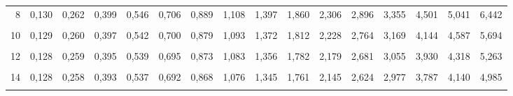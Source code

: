 \documentclass[
  ngerman,
]{article}
\begin{document}
\begin{table}[!h]
{\begin{tabular}{>{}r|rrrrrrrrrrrrrrr}
8 & 0,130 & 0,262 & 0,399 & 0,546 & 0,706 & 0,889 & 1,108 & 1,397 & 1,860 & 2,306 & 2,896 & 3,355 & 4,501 & 5,041 & 6,442\\
\cellcolor{gray!6}{9} & \cellcolor{gray!6}{0,129} & \cellcolor{gray!6}{0,261} & \cellcolor{gray!6}{0,398} & \cellcolor{gray!6}{0,543} & \cellcolor{gray!6}{0,703} & \cellcolor{gray!6}{0,883} & \cellcolor{gray!6}{1,100} & \cellcolor{gray!6}{1,383} & \cellcolor{gray!6}{1,833} & \cellcolor{gray!6}{2,262} & \cellcolor{gray!6}{2,821} & \cellcolor{gray!6}{3,250} & \cellcolor{gray!6}{4,297} & \cellcolor{gray!6}{4,781} & \cellcolor{gray!6}{6,010}\\
10 & 0,129 & 0,260 & 0,397 & 0,542 & 0,700 & 0,879 & 1,093 & 1,372 & 1,812 & 2,228 & 2,764 & 3,169 & 4,144 & 4,587 & 5,694\\
\addlinespace
\cellcolor{gray!6}{11} & \cellcolor{gray!6}{0,129} & \cellcolor{gray!6}{0,260} & \cellcolor{gray!6}{0,396} & \cellcolor{gray!6}{0,540} & \cellcolor{gray!6}{0,697} & \cellcolor{gray!6}{0,876} & \cellcolor{gray!6}{1,088} & \cellcolor{gray!6}{1,363} & \cellcolor{gray!6}{1,796} & \cellcolor{gray!6}{2,201} & \cellcolor{gray!6}{2,718} & \cellcolor{gray!6}{3,106} & \cellcolor{gray!6}{4,025} & \cellcolor{gray!6}{4,437} & \cellcolor{gray!6}{5,453}\\
12 & 0,128 & 0,259 & 0,395 & 0,539 & 0,695 & 0,873 & 1,083 & 1,356 & 1,782 & 2,179 & 2,681 & 3,055 & 3,930 & 4,318 & 5,263\\
\cellcolor{gray!6}{13} & \cellcolor{gray!6}{0,128} & \cellcolor{gray!6}{0,259} & \cellcolor{gray!6}{0,394} & \cellcolor{gray!6}{0,538} & \cellcolor{gray!6}{0,694} & \cellcolor{gray!6}{0,870} & \cellcolor{gray!6}{1,079} & \cellcolor{gray!6}{1,350} & \cellcolor{gray!6}{1,771} & \cellcolor{gray!6}{2,160} & \cellcolor{gray!6}{2,650} & \cellcolor{gray!6}{3,012} & \cellcolor{gray!6}{3,852} & \cellcolor{gray!6}{4,221} & \cellcolor{gray!6}{5,111}\\
14 & 0,128 & 0,258 & 0,393 & 0,537 & 0,692 & 0,868 & 1,076 & 1,345 & 1,761 & 2,145 & 2,624 & 2,977 & 3,787 & 4,140 & 4,985\\
\cellcolor{gray!6}{15} & \cellcolor{gray!6}{0,128} & \cellcolor{gray!6}{0,258} & \cellcolor{gray!6}{0,393} & \cellcolor{gray!6}{0,536} & \cellcolor{gray!6}{0,691} & \cellcolor{gray!6}{0,866} & \cellcolor{gray!6}{1,074} & \cellcolor{gray!6}{1,341} & \cellcolor{gray!6}{1,753} & \cellcolor{gray!6}{2,131} & \cellcolor{gray!6}{2,602} & \cellcolor{gray!6}{2,947} & \cellcolor{gray!6}{3,733} & \cellcolor{gray!6}{4,073} & \cellcolor{gray!6}{4,880}\\

\end{tabular}}
\end{table}
\end{document}
